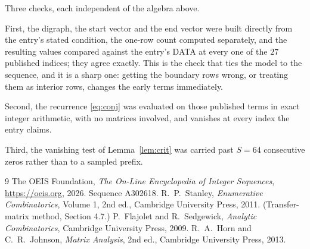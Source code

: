\documentclass[11pt,a4paper]{article}
\theoremstyle{plain}
\theoremstyle{definition}
\begin{document}
Three checks, each independent of the algebra above.

First, the digraph, the start vector and the end vector were built directly from the
entry's stated condition, the one-row count computed separately, and the resulting values
compared against the entry's DATA at every one of the $27$ published indices; they
agree exactly. This is the check that ties the model to the sequence, and it is a sharp one:
getting the boundary rows wrong, or treating them as interior rows, changes the early terms
immediately.

Second, the recurrence \eqref{eq:conj} was evaluated on those published terms in exact
integer arithmetic, with no matrices involved, and vanishes at every index the entry claims.

Third, the vanishing test of Lemma~\ref{lem:crit} was carried past $S=64$ consecutive
zeros rather than to a sampled prefix.

\begin{thebibliography}{9}
 The OEIS Foundation, \emph{The On-Line Encyclopedia of Integer
Sequences}, \url{https://oeis.org}, 2026. Sequence A302618.
 R.~P.~Stanley, \emph{Enumerative Combinatorics}, Volume 1, 2nd ed.,
Cambridge University Press, 2011. (Transfer-matrix method, Section 4.7.)
 P.~Flajolet and R.~Sedgewick, \emph{Analytic Combinatorics}, Cambridge
University Press, 2009.
 R.~A.~Horn and C.~R.~Johnson, \emph{Matrix Analysis}, 2nd ed., Cambridge
University Press, 2013.
\end{thebibliography}
\end{document}
